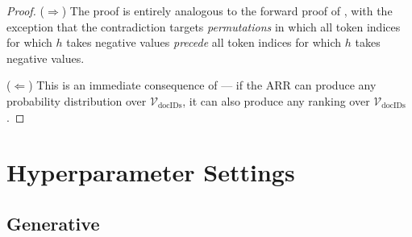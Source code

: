 \documentclass[11pt, a4paper, onecolumn, confidential, copyright, gdm]{google}
\newcommand{\Vdocids}{\mathscr{V}_{\text{docIDs}}}
\begin{document}
\PropArbitraryTokenLevelRanking*

\begin{proof}
($\Rightarrow$) The proof is entirely analogous to the forward proof of , with the exception that the contradiction targets \textit{permutations} in which all token indices for which $h$ takes negative values \textit{precede} all token indices for which $h$ takes negative values.

($\Leftarrow$) This is an immediate consequence of  — if the ARR can produce any probability distribution over $\Vdocids$, it can also produce any ranking over $\Vdocids$.
\end{proof}

\newpage
\section{Hyperparameter Settings}\label{sec:appendix-hparams}

\subsection{Generative}\label{sec:hparams-generative}
\end{document}
